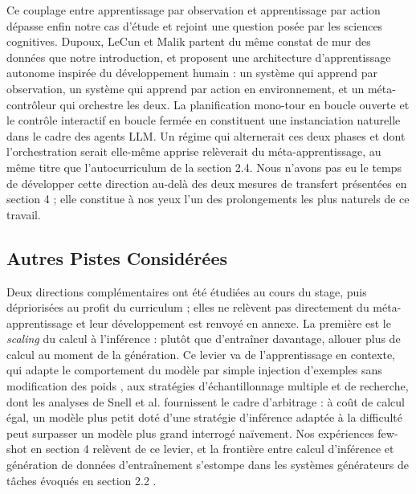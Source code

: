 \documentclass[11pt,a4paper]{article}
\begin{document}
Ce couplage entre apprentissage par observation et apprentissage par action dépasse enfin notre cas d'étude et rejoint une question posée par les sciences cognitives. Dupoux, LeCun et Malik \cite{dupoux2026why} partent du même constat de mur des données que notre introduction, et proposent une architecture d'apprentissage autonome inspirée du développement humain : un système qui apprend par observation, un système qui apprend par action en environnement, et un méta-contrôleur qui orchestre les deux. La planification mono-tour en boucle ouverte et le contrôle interactif en boucle fermée en constituent une instanciation naturelle dans le cadre des agents LLM. Un régime qui alternerait ces deux phases et dont l'orchestration serait elle-même apprise relèverait du méta-apprentissage, au même titre que l'autocurriculum de la section 2.4. Nous n'avons pas eu le temps de développer cette direction au-delà des deux mesures de transfert présentées en section 4 ; elle constitue à nos yeux l'un des prolongements les plus naturels de ce travail.

\subsection{Autres Pistes Considérées}

Deux directions complémentaires ont été étudiées au cours du stage, puis dépriorisées au profit du curriculum ; elles ne relèvent pas directement du méta-apprentissage et leur développement est renvoyé en annexe. La première est le \emph{scaling} du calcul à l'inférence : plutôt que d'entraîner davantage, allouer plus de calcul au moment de la génération. Ce levier va de l'apprentissage en contexte, qui adapte le comportement du modèle par simple injection d'exemples sans modification des poids \cite{brown2020gpt3}, aux stratégies d'échantillonnage multiple et de recherche, dont les analyses de Snell et al. \cite{snell2024scaling} fournissent le cadre d'arbitrage : à coût de calcul égal, un modèle plus petit doté d'une stratégie d'inférence adaptée à la difficulté peut surpasser un modèle plus grand interrogé naïvement. Nos expériences few-shot en section 4 relèvent de ce levier, et la frontière entre calcul d'inférence et génération de données d'entraînement s'estompe dans les systèmes générateurs de tâches évoqués en section 2.2 \cite{zhou2025sca, dreamgym2025}.
\end{document}
